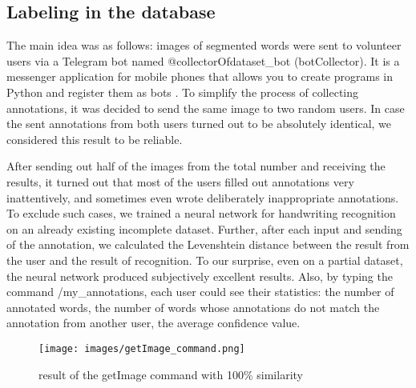 \documentclass[preprint,12pt]{elsarticle}
\begin{document}
\subsection{Labeling in the database}

The main idea was as follows:
images of segmented words were sent to volunteer users via a Telegram bot named @collectorOfdataset\_bot (botCollector). It is a messenger application for mobile phones that allows you to create programs in Python and register them as bots \cite{telegram}. To simplify the process of collecting annotations, it was decided to send the same image to two random users. In case the sent annotations from both users
turned out to be absolutely identical, we considered this result to be reliable.

After sending out half of the images from the total number and receiving the results, it turned out that most of the users filled out annotations very inattentively, and sometimes even wrote deliberately inappropriate annotations.
To exclude such cases, we trained a neural network for handwriting recognition on an already existing incomplete dataset. Further, after each input and sending of the annotation, we calculated the Levenshtein distance between the result from the user and the result of recognition. To our surprise, even on a partial dataset, the neural network produced subjectively excellent results.
Also, by typing the command /my\_annotations, each user could see their statistics: the number of annotated words, the number of words whose annotations do not match the annotation from another user, the average confidence value.
\begin{figure}[!ht]
    \centering
    \texttt{[image: images/getImage\_command.png]}
    \caption{result of the getImage command with 100\% similarity}
    \label{fig:bot_capture}
\end{figure}
\end{document}
